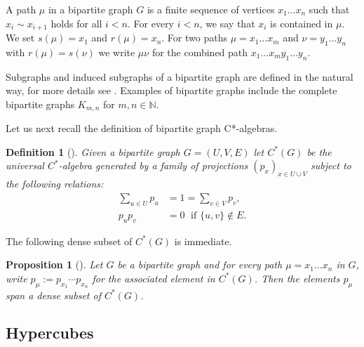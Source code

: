 \documentclass[a4paper]{amsart}
\newcommand{\N}{\mathbb{N}}
\newtheorem{definition}[thm]{Definition}
\newtheorem{proposition}[thm]{Proposition}
\begin{document}
A path $\mu$ in a bipartite graph $G$ is a finite sequence of vertices $x_1 \dots x_n$ such that $x_i \sim x_{i+1}$ holds for all $i < n$. For every $i < n$, we say that $x_i$ is contained in $\mu$. We set $s(\mu) = x_1$ and $r(\mu) = x_n$. For two paths $\mu=x_1 \dots x_m$ and $\nu = y_1 \dots y_n$ with $r(\mu) = s(\nu)$ we write $\mu \nu$ for the combined path $x_1 \dots x_m y_1 \dots y_n$.

Subgraphs and induced subgraphs of a bipartite graph are defined in the natural way, for more details see \cite[Definition 2.3]{schafer_classification_2025}. Examples of bipartite graphs include the complete bipartite graphs $K_{m,n}$ for $m,n \in \N$.

Let us next recall the definition of bipartite graph C*-algebras.

\begin{definition}[{\cite[Definition 2.4]{schafer_classification_2025}}]
    \label{bipartite_graph_algebras:definition}
    Given a bipartite graph $G = (U, V, E)$ let $C^\ast(G)$ be the universal $C^\ast$-algebra generated by a family of projections $(p_x)_{x \in U \cup V}$ subject to the following relations:
    \begin{align}
        \sum_{u \in U} p_u &= 1 = \sum_{v \in V} p_v,        \tag{GP1} \label{bga::eq:partition_relation} \\
        p_u p_v &= 0 \; \text{ if } \{u, v\} \not \in E.  \tag{GP2} \label{bga::eq:orthogonality_relation}
    \end{align}
\end{definition}

The following dense subset of $C^\ast(G)$ is immediate.

\begin{proposition}[{\cite[Proposition 2.6]{schafer_classification_2025}}]
    \label{prop::bipartite_graph_algebras:definition:dense_subset}
    Let $G$ be a bipartite graph and for every path $\mu = x_1 \dots x_n$ in $G$, write $p_\mu := p_{x_1} \cdots p_{x_n}$ for the associated element in $C^\ast(G)$. Then the elements $p_\mu$ span a dense subset of $C^\ast(G)$. %
\end{proposition}

\subsection{Hypercubes}
\label{sec::hypercubes}
\end{document}
